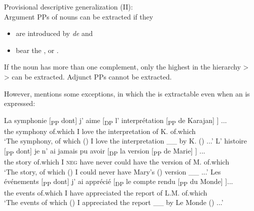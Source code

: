 \documentclass[output=paper]{langsci/langscibook}
\begin{document}
\begin{exe}
\ex%
    \label{ex:mensch:11}
Provisional descriptive generalization (II):\\
          Argument PPs of nouns can be extracted if they
          
            \begin{itemize}
                \item are introduced by \textit{de} and
                \item bear the  \AGENT, \THEME or \POSSESSOR.
            \end{itemize}
If the noun has more than one complement, only the highest in the hierarchy  \POSSESSOR > \AGENT > \THEME can be extracted. Adjunct PPs cannot be extracted.
\end{exe}

However, \citet[160]{Pollock1989} mentions some exceptions, in which the \THEME is extractable even when an \AGENT is expressed:

\ea%
    \label{ex:mensch:12}
    \ea
    \gll La symphonie  [\textsubscript{PP} dont]  j’  aime  [\textsubscript{DP} l’  interprétation      [\textsubscript{PP} de Karajan]  \soutp{[\textsubscript{PP}}{2} \soute{dont]}] ...\\
         the symphony {} of.which  I   love   {}     the interpretation     {}       of  K. {}     of.which\\
    \glt ‘The symphony, of which (\THEME) I love the interpretation \_\_ by K. (\AGENT) ...’
    \ex  
    \gll L’  histoire [\textsubscript{PP}  dont]     je   n’  ai  jamais  pu  avoir [\textsubscript{DP} la    version   [\textsubscript{PP}  de Marie] \soutp{[\textsubscript{PP}}{2}  \soute{dont]}] ...\\
         the  story  {}   of.which     I   \textsc{neg}  have  never  could  have {}  the      version {}    of M.  {}  of.which \\
    \glt ‘The story, of which (\THEME) I could never have Mary’s (\AGENT) version \_\_ ...’
    \ex  
    \gll Les  événements [\textsubscript{PP}  dont]  j’ ai  apprécié [\textsubscript{DP} le  {compte rendu}     [\textsubscript{PP}  du Monde] \soutp{[\textsubscript{PP}}{2}  \soute{dont]}]...\\
         the  events {}    of.which  I have  appreciated {}  the  report {}  of L.M.  {}  of.which\\
    \glt ‘The events of which (\THEME) I appreciated the report \_\_ by Le Monde (\AGENT) ...’
    \z
\z
\end{document}

